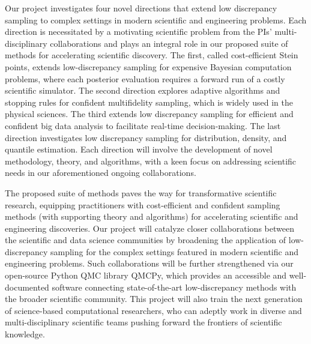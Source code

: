 \documentclass[11pt]{article}%
\begin{document}
\noindent Our project investigates four novel directions that extend low discrepancy sampling to complex settings in modern scientific and engineering problems. Each direction is necessitated by a motivating scientific problem from the PIs' multi-disciplinary collaborations and plays an integral role in our proposed suite of methods for accelerating scientific discovery. The first, called cost-efficient Stein points, extends low-discrepancy sampling for expensive Bayesian computation problems, where each posterior evaluation requires a forward run of a costly scientific simulator. The second direction explores adaptive algorithms and stopping rules for confident multifidelity sampling, which is widely used in the physical sciences. The third extends low discrepancy sampling for efficient and confident big data analysis to facilitate real-time decision-making. The last direction investigates low discrepancy sampling for distribution, density, and quantile estimation. Each direction will involve the development of novel methodology, theory, and algorithms, with a keen focus on addressing scientific needs in our aforementioned ongoing collaborations.


\bigskip 


\noindent The proposed suite of methods paves the way for transformative scientific research, equipping practitioners with cost-efficient and confident sampling methods (with supporting theory and algorithms) for accelerating scientific and engineering discoveries. Our project will catalyze closer collaborations between the scientific and data science communities by broadening the application of low-discrepancy sampling for the complex settings featured in modern scientific 
and engineering problems. Such collaborations will be further strengthened via our open-source Python QMC library QMCPy, which provides an accessible and well-documented software connecting state-of-the-art low-discrepancy methods with the broader scientific community. This project will also train the next generation of science-based computational researchers, who can adeptly work in diverse and multi-disciplinary scientific teams pushing forward the frontiers of scientific knowledge. 

 
%
\end{document}
